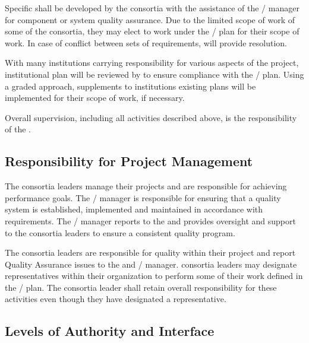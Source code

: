 Specific  shall be developed by the consortia with the
assistance of the /  manager for
component or system quality assurance. Due to the limited scope of
work of some of the consortia, they may elect to work under the
/  plan for their scope of work. In
case of conflict between sets of  requirements, 
 will provide resolution.

With many institutions carrying responsibility for various aspects of
the project, institutional  plan will be reviewed by
  to ensure compliance with the
/  plan. Using a graded approach,
supplements to institutions existing plans will be implemented for
their  scope of work, if necessary.

Overall  supervision, including all activities described
above, is the responsibility of the  .

\subsection{Responsibility for Project Management}

The  consortia leaders manage their projects and are
responsible for achieving performance goals. The
/  manager is responsible for
ensuring that a quality system is established, implemented and
maintained in accordance with requirements. The
/  manager reports to the
  and provides oversight and support to the
consortia leaders to ensure a consistent quality program.

The  consortia leaders are responsible for quality within
their project and report Quality Assurance issues to the 
 and / 
manager.  consortia leaders may designate 
representatives within their organization to perform some of their
work defined in the /  plan. The
 consortia leader shall retain overall responsibility for
these activities even though they have designated a 
representative.

\subsection{Levels of Authority and Interface}

